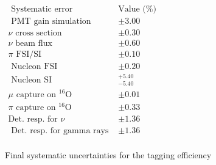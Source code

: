 \begin{table}[htb!]
\centering
    $\begin{array}{lll}
    \hline \text { Systematic error} & \text{Value (\%)} \\
    \hline 
    \text { PMT gain simulation } & \pm 3.00 \\ 
    \nu \text { cross section } & \pm 0.30 \\ 
    \nu \text { beam flux } & \pm 0.60 \\ 
    \pi \text { FSI/SI } & \pm 0.10  \\ 
    \text { Nucleon FSI } & \pm 0.20  \\ 
    \text { Nucleon SI } & { }_{-5.40}^{+5.40} \\ 
    \mu \text { capture on }{ }^{16} \mathrm{O} & \pm 0.01\\ 
    \pi \text { capture on }{ }^{16} \mathrm{O} & \pm 0.33\\
    \text{Det. resp. for $\nu$} & \pm 1.36\\
    \text { Det. resp. for gamma rays }& \pm 1.36 \\ 
    \end{array}$
\caption{Final systematic uncertainties for the tagging efficiency} 
\label{table:systuncertaintytable}
\end{table}


